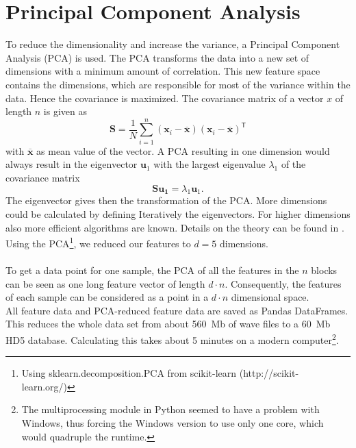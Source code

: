 \section{Principal Component Analysis}
To reduce the dimensionality and increase the variance, a Principal Component Analysis (PCA) is used. The PCA transforms the data into a new set of dimensions with a minimum amount of correlation. This new feature space contains the dimensions, which are responsible for most of the variance within the data. Hence the covariance is maximized. The covariance matrix of a vector $x$ of length $n$ is given as
\[
    \mathbf{S} = \frac{1}{N} \sum_{i=1}^{n}{(\mathbf{x}_i - \overline{\mathbf{x}}) (\mathbf{x}_i - \overline{\mathbf{x}})^\mathsf{T}}
\]
with $\overline{\mathbf{x}}$ as mean value of the vector. A PCA resulting in one dimension would always result in the eigenvector $\mathbf{u}_1$ with the largest eigenvalue $\lambda_1$ of the covariance matrix
\[
    \mathbf{S} \mathbf{u_1} = \lambda_1 \mathbf{u}_1.
\]
The eigenvector gives then the transformation of the PCA. More dimensions could be calculated by defining Iteratively the eigenvectors. For higher dimensions also more efficient algorithms are known. Details on the theory can be found in \cite[p.~561]{bib:Bishop2006}. Using the PCA\footnote{Using sklearn.decomposition.PCA from scikit-learn (http://scikit-learn.org/)}, we reduced our features to $d=5$ dimensions.\\\\
To get a data point for one sample, the PCA of all the features in the $n$ blocks can be seen as one long feature vector of length $d \cdot n$. Consequently, the features of each sample can be considered as a point in a $d \cdot n$ dimensional space.\\
All feature data and PCA-reduced feature data are saved as Pandas DataFrames. This reduces the whole data set from about 560~Mb of wave files to a 60~Mb HD5 database. Calculating this takes about 5 minutes on a modern computer\footnote{The multiprocessing module in Python seemed to have a problem with Windows, thus forcing the Windows version to use only one core, which would quadruple the runtime.}.
